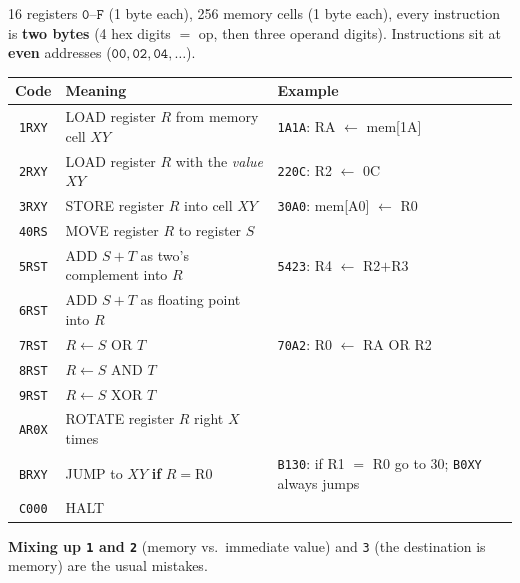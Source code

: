 \documentclass{fkt-notes}
\newcommand{\hx}[1]{\texttt{#1}}
\begin{document}
16 registers $\hx{0}$--$\hx{F}$ (1 byte each), 256 memory cells (1 byte each), every instruction
is \textbf{two bytes} (4 hex digits $=$ op, then three operand digits). Instructions sit at
\textbf{even} addresses ($\hx{00},\hx{02},\hx{04},\dots$).
\begin{center}
  \small\renewcommand{\arraystretch}{1.15}
  \begin{tabular}{@{}cll@{}}
    \toprule
    Code      & Meaning                                      & Example                                                  \\
    \midrule
    \hx{1RXY} & LOAD register $R$ from memory cell $XY$      & \hx{1A1A}: RA $\leftarrow$ mem[1A]                       \\
    \hx{2RXY} & LOAD register $R$ with the \emph{value} $XY$ & \hx{220C}: R2 $\leftarrow$ 0C                            \\
    \hx{3RXY} & STORE register $R$ into cell $XY$            & \hx{30A0}: mem[A0] $\leftarrow$ R0                       \\
    \hx{40RS} & MOVE register $R$ to register $S$            &                                                          \\
    \hx{5RST} & ADD $S+T$ as two's complement into $R$       & \hx{5423}: R4 $\leftarrow$ R2$+$R3                       \\
    \hx{6RST} & ADD $S+T$ as floating point into $R$         &                                                          \\
    \hx{7RST} & $R\leftarrow S$ OR $T$                       & \hx{70A2}: R0 $\leftarrow$ RA OR R2                      \\
    \hx{8RST} & $R\leftarrow S$ AND $T$                      &                                                          \\
    \hx{9RST} & $R\leftarrow S$ XOR $T$                      &                                                          \\
    \hx{AR0X} & ROTATE register $R$ right $X$ times          &                                                          \\
    \hx{BRXY} & JUMP to $XY$ \textbf{if} $R=\text{R0}$       & \hx{B130}: if R1 $=$ R0 go to 30; \hx{B0XY} always jumps \\
    \hx{C000} & HALT                                         &                                                          \\
    \bottomrule
  \end{tabular}
\end{center}
\textbf{Mixing up \hx{1} and \hx{2}} (memory vs.\ immediate value) and \hx{3} (the destination is memory)
are the usual mistakes.
\end{document}
